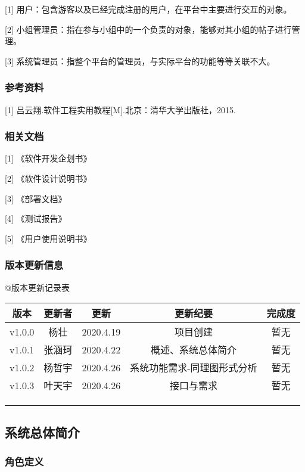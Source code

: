 \documentclass[
]{article}
\begin{document}
{[}1{]}
用户：包含游客以及已经完成注册的用户，在平台中主要进行交互的对象。

{[}2{]}
小组管理员：指在参与小组中的一个负责的对象，能够对其小组的帖子进行管理。

{[}3{]} 系统管理员：指整个平台的管理员，与实际平台的功能等等关联不大。

\hypertarget{header-n11}{%
\subsubsection{参考资料}\label{header-n11}}

{[}1{]} 吕云翔.软件工程实用教程{[}M{]}.北京：清华大学出版社，2015.

\hypertarget{header-n13}{%
\subsubsection{相关文档}\label{header-n13}}

{[}1{]} 《软件开发企划书》

{[}2{]} 《软件设计说明书》

{[}3{]} 《部署文档》

{[}4{]} 《测试报告》

{[}5{]} 《用户使用说明书》

\hypertarget{header-n19}{%
\subsubsection{版本更新信息}\label{header-n19}}

@版本更新记录表

\begin{longtable}[]{@{}ccccc@{}}
\toprule
版本 & 更新者 & 更新 & 更新纪要 & 完成度\tabularnewline
\midrule
\endhead
v1.0.0 & 杨壮 & 2020.4.19 & 项目创建 & 暂无\tabularnewline
v1.0.1 & 张涵珂 & 2020.4.22 & 概述、系统总体简介 & 暂无\tabularnewline
v1.0.2 & 杨哲宇 & 2020.4.26 & 系统功能需求-同理图形式分析 &
暂无\tabularnewline
v1.0.3 & 叶天宇 & 2020.4.26 & 接口与需求 & 暂无\tabularnewline
& & & &\tabularnewline
& & & &\tabularnewline
& & & &\tabularnewline
\bottomrule
\end{longtable}

\hypertarget{header-n70}{%
\subsection{系统总体简介}\label{header-n70}}

\hypertarget{header-n71}{%
\subsubsection{角色定义}\label{header-n71}}
\end{document}

